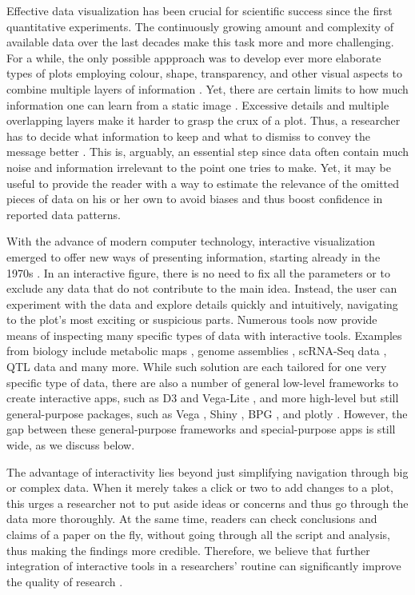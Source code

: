 \documentclass[twocolumn,10pt]{article}
\begin{document}
Effective data visualization has been crucial for scientific success since the first quantitative experiments. The continuously growing amount and complexity of available data over the last decades make this task more and more challenging. For a while, the only possible appproach was to develop ever more elaborate types of plots employing colour, shape, transparency, and other visual aspects to combine multiple layers of information \citep{bertin_2011, tufte_1983, wilkinson_1999}. Yet, there are certain limits to how much information one can learn from a static image \citep{hegarty_2011}. Excessive details and multiple overlapping layers make it harder to grasp the crux of a plot. Thus, a researcher has to decide what information to keep and what to dismiss to convey the message better \citep{odonoghue_2018}. This is, arguably, an essential step since data often contain much noise and information irrelevant to the point one tries to make. Yet, it may be useful to provide the reader with a way to estimate the relevance of the omitted pieces of data on his or her own to avoid biases \citep{bresciani_2009} and thus boost confidence in reported data patterns.

With the advance of modern computer technology, interactive visualization emerged to offer new ways of presenting information, starting already in the 1970s \citep{newman_1979, becker_1987}. In an interactive figure, there is no need to fix all the parameters or to exclude any data that do not contribute to the main idea. Instead, the user can experiment with the data and explore details quickly and intuitively, navigating to the plot's most exciting or suspicious parts. Numerous tools \citep{caldarola_2017} now provide means of inspecting many specific types of data with interactive tools. Examples from biology include metabolic maps \citep{noronha_2017}, genome assemblies \citep{wick_2015}, scRNA-Seq data \citep{hillje_2020}, QTL data \citep{broman_2015} and many more. While such solution are each tailored for one very specific type of data, there are also a number of general low-level frameworks to create interactive apps, such as D3 \citep{bostock_2011} and Vega-Lite \citep{satyanarayan_2015}, and more high-level but still general-purpose packages, such as Vega \citep{satyanarayan_2016}, Shiny \citep{shiny}, BPG \citep{p_2019}, and plotly \citep{sievert_2019, sievert_2020}. However, the gap between these general-purpose frameworks and special-purpose apps is still wide, as we discuss below.

The advantage of interactivity lies beyond just simplifying navigation through big or complex data. When it merely takes a click or two to add changes to a plot, this urges a researcher not to put aside ideas or concerns and thus go through the data more thoroughly. At the same time, readers can check conclusions and claims of a paper on the fly, without going through all the script and analysis, thus making the findings more credible. Therefore, we believe that further integration of interactive tools in a researchers' routine can significantly improve the quality of research \citep{shander_2016, yuk_2014}.
\end{document}
